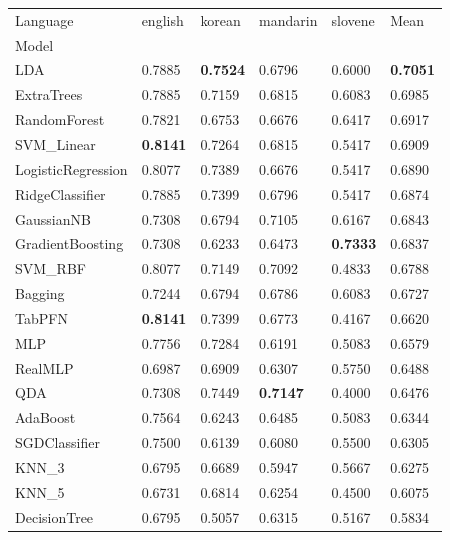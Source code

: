 \begin{tabular}{llllll}
\toprule
Language & english & korean & mandarin & slovene & Mean \\
Model &  &  &  &  &  \\
\midrule
LDA & 0.7885 & \textbf{0.7524} & 0.6796 & 0.6000 & \textbf{0.7051} \\
ExtraTrees & 0.7885 & 0.7159 & 0.6815 & 0.6083 & 0.6985 \\
RandomForest & 0.7821 & 0.6753 & 0.6676 & 0.6417 & 0.6917 \\
SVM_Linear & \textbf{0.8141} & 0.7264 & 0.6815 & 0.5417 & 0.6909 \\
LogisticRegression & 0.8077 & 0.7389 & 0.6676 & 0.5417 & 0.6890 \\
RidgeClassifier & 0.7885 & 0.7399 & 0.6796 & 0.5417 & 0.6874 \\
GaussianNB & 0.7308 & 0.6794 & 0.7105 & 0.6167 & 0.6843 \\
GradientBoosting & 0.7308 & 0.6233 & 0.6473 & \textbf{0.7333} & 0.6837 \\
SVM_RBF & 0.8077 & 0.7149 & 0.7092 & 0.4833 & 0.6788 \\
Bagging & 0.7244 & 0.6794 & 0.6786 & 0.6083 & 0.6727 \\
TabPFN & \textbf{0.8141} & 0.7399 & 0.6773 & 0.4167 & 0.6620 \\
MLP & 0.7756 & 0.7284 & 0.6191 & 0.5083 & 0.6579 \\
RealMLP & 0.6987 & 0.6909 & 0.6307 & 0.5750 & 0.6488 \\
QDA & 0.7308 & 0.7449 & \textbf{0.7147} & 0.4000 & 0.6476 \\
AdaBoost & 0.7564 & 0.6243 & 0.6485 & 0.5083 & 0.6344 \\
SGDClassifier & 0.7500 & 0.6139 & 0.6080 & 0.5500 & 0.6305 \\
KNN_3 & 0.6795 & 0.6689 & 0.5947 & 0.5667 & 0.6275 \\
KNN_5 & 0.6731 & 0.6814 & 0.6254 & 0.4500 & 0.6075 \\
DecisionTree & 0.6795 & 0.5057 & 0.6315 & 0.5167 & 0.5834 \\
\bottomrule
\end{tabular}
